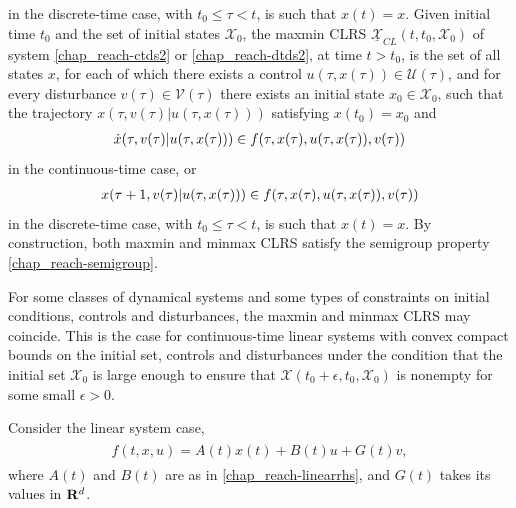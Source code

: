 \documentclass[letterpaper,10pt,english]{sphinxmanual}
\begin{document}
in the discrete-time case, with $t_0\leqslant\tau<t$, is such
that $x(t)=x$.
Given initial time $t_0$ and the set of initial states ${\mathcal X}_0$, the
maxmin CLRS $\underline{{\mathcal X}}_{CL}(t, t_0, {\mathcal X}_0)$ of system
\eqref{chap_reach-ctds2} or \eqref{chap_reach-dtds2}, at time $t>t_0$, is the set of all states
$x$, for each of which there exists a control
$u(\tau, x(\tau))\in{\mathcal U}(\tau)$, and for every disturbance
$v(\tau)\in{\mathcal V}(\tau)$ there exists an initial state
$x_0\in{\mathcal X}_0$, such that the trajectory
$x(\tau, v(\tau) | u(\tau, x(\tau)))$ satisfying
$x(t_0) = x_0$ and
\begin{gather}
\begin{split}\dot{x}(\tau, v(\tau) | u(\tau, x(\tau))) \in
f(\tau, x(\tau), u(\tau, x(\tau)), v(\tau))\end{split}\notag
\end{gather}
in the continuous-time case, or
\begin{gather}
\begin{split}x(\tau+1, v(\tau) | u(\tau, x(\tau))) \in
f(\tau, x(\tau), u(\tau, x(\tau)), v(\tau))\end{split}\notag
\end{gather}
in the discrete-time case, with $t_0\leqslant\tau<t$, is such
that $x(t)=x$.
By construction, both
maxmin and minmax CLRS satisfy the semigroup property \eqref{chap_reach-semigroup}.

For some classes of dynamical systems and some types of constraints on
initial conditions, controls and disturbances, the maxmin and minmax
CLRS may coincide. This is the case for continuous-time linear systems
with convex compact bounds on the initial set, controls and disturbances
under the condition that the initial set ${\mathcal X}_0$ is large
enough to ensure that
${\mathcal X}(t_0+\epsilon, t_0, {\mathcal X}_0)$ is nonempty for
some small $\epsilon>0$.

Consider the linear system case,
\label{chap_reach:equation-linearrhsdist}\begin{gather}
\begin{split}f(t, x, u) = A(t)x(t) + B(t)u + G(t)v,\end{split}\label{chap_reach-linearrhsdist}
\end{gather}
where $A(t)$ and $B(t)$ are as in \eqref{chap_reach-linearrhs}, and
$G(t)$ takes its values in ${\bf R}^d$.
\end{document}
